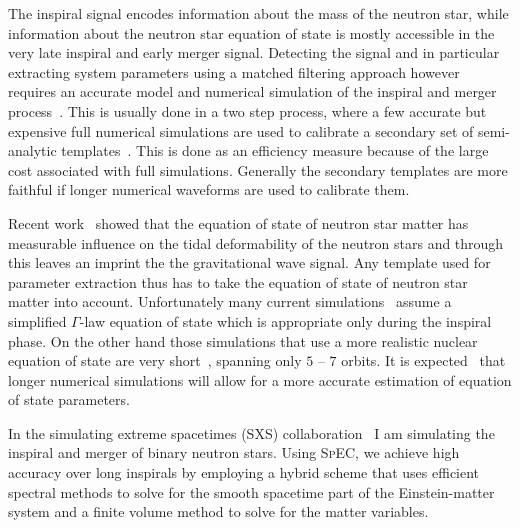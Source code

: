 \documentclass[12pt]{article}
\newcommand{\code}[1]{\textsc{#1}}
\newcommand{\todo}[1]{{\color{blue}TODO: #1}}
\begin{document}
The inspiral signal encodes information about the mass of the neutron star,
while information about the neutron star equation of state is mostly
accessible in the
very late
inspiral and early merger signal. Detecting the signal and in particular
extracting
system parameters using a matched filtering approach however requires an
accurate model and numerical simulation of the inspiral and merger
process~\cite{Anderson:2007km}. This is usually done in a two step process,
where a few accurate but expensive full numerical simulations are used to
calibrate a secondary set of semi-analytic templates~\cite{Bernuzzi:2012ci}.
This is done as an
efficiency measure because of the large cost associated with full
simulations. Generally the secondary templates are more faithful if longer
numerical waveforms are used to calibrate them. 


Recent work~\cite{Hinderer:2009ca,Read:2009yp} showed that the equation of
state of neutron star
matter has measurable influence on the tidal deformability of the neutron
stars and through this leaves an imprint the the gravitational wave signal.
Any template used for parameter extraction thus has to take the 
equation of state of neutron star matter into account. 
Unfortunately many current simulations~\cite{Bernuzzi:2012ci,
Giacomazzo:2010bx,Baiotti:2011am,East:2012ww,Foucart:2012vn,Haas:nsns}
assume
a simplified $\Gamma$-law equation of state which is appropriate only during
the inspiral phase. On the other hand those simulations that use a more realistic
nuclear equation of state are very
short~\cite{Hotokezaka:2011dh}, spanning only $5$ -- $7$ orbits.
It is expected~\cite{Read:2009yp} that longer numerical simulations will allow
for a more accurate estimation of equation of state parameters.

In the simulating extreme spacetimes (SXS) collaboration~\cite{SXS:web}
I am simulating the inspiral and merger of binary neutron
stars.
Using \code{SpEC}, we achieve high accuracy over long inspirals 
by employing a hybrid scheme
that uses efficient spectral methods to solve for the smooth spacetime part of
the Einstein-matter system and a finite volume method to solve for the matter
variables.
\end{document}
